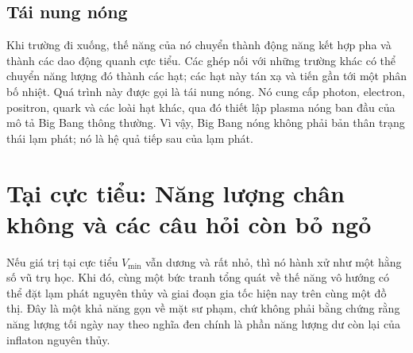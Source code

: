 \subsection{Tái nung nóng}

Khi trường đi xuống, thế năng của nó chuyển thành động năng kết hợp pha và thành các dao động quanh cực tiểu. Các ghép nối với những trường khác có thể chuyển năng lượng đó thành các hạt; các hạt này tán xạ và tiến gần tới một phân bố nhiệt. Quá trình này được gọi là tái nung nóng. Nó cung cấp photon, electron, positron, quark và các loài hạt khác, qua đó thiết lập plasma nóng ban đầu của mô tả Big Bang thông thường. Vì vậy, Big Bang nóng không phải bản thân trạng thái lạm phát; nó là hệ quả tiếp sau của lạm phát.

\begin{classroomqa}
\end{classroomqa}

\begin{classroomqa}
\end{classroomqa}

\section{Tại cực tiểu: Năng lượng chân không và các câu hỏi còn bỏ ngỏ}

Nếu giá trị tại cực tiểu \(V_{\min}\) vẫn dương và rất nhỏ, thì nó hành xử như một hằng số vũ trụ học. Khi đó, cùng một bức tranh tổng quát về thế năng vô hướng có thể đặt lạm phát nguyên thủy và giai đoạn gia tốc hiện nay trên cùng một đồ thị. Đây là một khả năng gọn về mặt sư phạm, chứ không phải bằng chứng rằng năng lượng tối ngày nay theo nghĩa đen chính là phần năng lượng dư còn lại của inflaton nguyên thủy.

